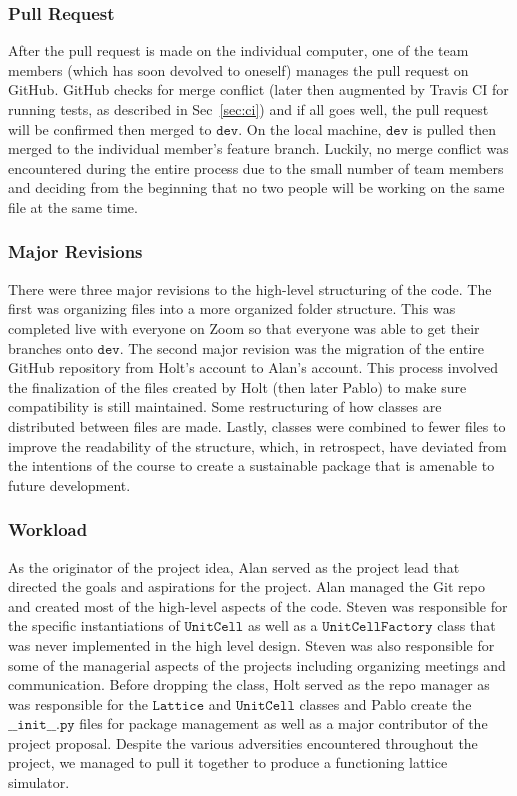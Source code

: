 \documentclass{article}
\begin{document}
\subsubsection{Pull Request}
\label{sec:pr}
After the pull request is made on the individual computer, one of the team members (which has soon devolved to oneself) manages the pull request on GitHub.  GitHub checks for merge conflict (later then augmented by Travis CI for running tests, as described in Sec~\ref{sec:ci}) and if all goes well, the pull request will be confirmed then merged to $\texttt{dev}$.  On the local machine, $\texttt{dev}$ is pulled then merged to the individual member's feature branch.  Luckily, no merge conflict was encountered during the entire process due to the small number of team members and deciding from the beginning that no two people will be working on the same file at the same time.

\subsubsection{Major Revisions}
There were three major revisions to the high-level structuring of the code.  The first was organizing files into a more organized folder structure.  This was completed live with everyone on Zoom so that everyone was able to get their branches onto $\texttt{dev}$.  The second major revision was the migration of the entire GitHub repository from Holt's account to Alan's account.  This process involved the finalization of the files created by Holt (then later Pablo) to make sure compatibility is still maintained.  Some restructuring of how classes are distributed between files are made.  Lastly, classes were combined to fewer files to improve the readability of the structure, which, in retrospect, have deviated from the intentions of the course to create a sustainable package that is amenable to future development.

\subsubsection{Workload}
As the originator of the project idea, Alan served as the project lead that directed the goals and aspirations for the project.  Alan managed the Git repo and created most of the high-level aspects of the code.  Steven was responsible for the specific instantiations of $\texttt{UnitCell}$ as well as a $\texttt{UnitCellFactory}$ class that was never implemented in the high level design.  Steven was also responsible for some of the managerial aspects of the projects including organizing meetings and communication.  Before dropping the class, Holt served as the repo manager as was responsible for the $\texttt{Lattice}$ and $\texttt{UnitCell}$ classes and Pablo create the $\texttt{\_\_init\_\_.py}$ files for package management as well as a major contributor of the project proposal.  Despite the various adversities encountered throughout the project, we managed to pull it together to produce a functioning lattice simulator.
\end{document}
